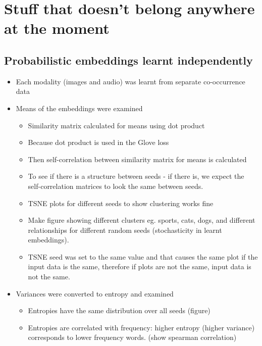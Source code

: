 \chapter{Stuff that doesn't belong anywhere at the moment}



\section{Probabilistic embeddings learnt independently}

\begin{itemize}
    \item Each modality (images and audio) was learnt from separate co-occurrence data
    \item Means of the embeddings were examined 
    \begin{itemize}
        \item Similarity matrix calculated for means using dot product
        \item Because dot product is used in the Glove loss
        \item Then self-correlation between similarity matrix for means is calculated
        \item To see if there is a structure between seeds - if there is, we expect the self-correlation matrices to look the same between seeds.
        \item TSNE plots for different seeds to show clustering works fine
        \item Make figure showing different clusters eg. sports, cats, dogs, and different relationships for different random seeds (stochasticity in learnt embeddings). 
        \item TSNE seed was set to the same value and that causes the same plot if the input data is the same, therefore if plots are not the same, input data is not the same. 
    \end{itemize}
    \item Variances were converted to entropy and examined
    \begin{itemize}
        \item Entropies have the same distribution over all seeds (figure)
        \item Entropies are correlated with frequency: higher entropy (higher variance) corresponds to lower frequency words. (show spearman correlation)
    \end{itemize}
\end{itemize}


